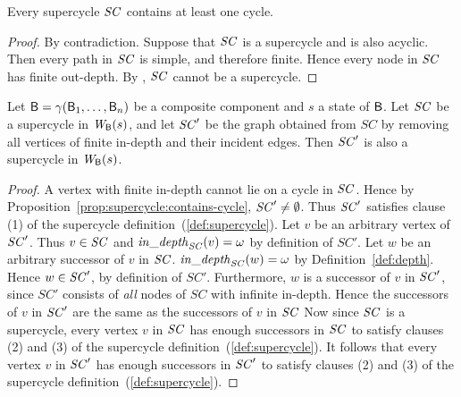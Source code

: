 \begin{proposition} \label{prop:supercycle:contains-cycle}
Every supercycle $\mathit{SC}$ contains at least one cycle.
\end{proposition} 
%
\begin{proof}
By contradiction. Suppose that $\mathit{SC}$ is a supercycle and is also acyclic. Then every path in $\mathit{SC}$ is simple, and therefore finite.  Hence every
node in $\mathit{SC}$ has finite out-depth. By , $\mathit{SC}$ cannot be a supercycle.
\end{proof}


\begin{proposition} \label{prop:supercycle:essential-subgraph-of} Let $\mathsf{B} =
\gamma(\mathsf{B}_1,\dots,\mathsf{B}_n)$ be a composite component and $s$ a state of
$\mathsf{B}$.  Let $\mathit{SC}$ be a supercycle in $\mathit{W}_{\mathsf{B}}({s})$, and let $\mathit{SC}'$ be the
graph obtained from $SC$ by removing all vertices of finite in-depth
and their incident edges. Then $\mathit{SC}'$ is also a supercycle in
$\mathit{W}_{\mathsf{B}}({s})$. 
\end{proposition} 
%
\begin{proof}
A vertex with finite in-depth cannot lie on a cycle in $\mathit{SC}$.  Hence
by Proposition~\ref{prop:supercycle:contains-cycle}, $\mathit{SC}' \neq
\emptyset$. Thus $\mathit{SC}'$ satisfies clause (1) of the supercycle
definition~(\ref{def:supercycle}).
%
Let $v$ be an arbitrary vertex of $\mathit{SC}'$.  Thus $v \in \mathit{SC}$ and $\mathit{in\_depth}_{\mathit{SC}}({v}) = \omega$ by definition of $SC'$. Let
$w$ be an arbitrary successor of $v$ in $\mathit{SC}$. $\mathit{in\_depth}_{\mathit{SC}}({w}) = \omega$ by Definition~\ref{def:depth}. Hence
$w \in \mathit{SC}'$, by definition of $SC'$.  Furthermore, $w$ is a successor of $v$ in $\mathit{SC}'$, since $SC'$ consists of
\emph{all} nodes of $SC$ with infinite in-depth. Hence the successors of $v$ in $\mathit{SC}'$ are
the same as the successors of $v$ in $\mathit{SC}$
%
%
Now since $\mathit{SC}$ is a supercycle, every vertex $v$ in $\mathit{SC}$ has enough successors in $\mathit{SC}$ to satisfy clauses (2) and (3)
of the supercycle definition~(\ref{def:supercycle}). It follows that every vertex $v$ in $\mathit{SC}'$ has enough successors in
$\mathit{SC}'$ to satisfy clauses (2) and (3) of the supercycle definition~(\ref{def:supercycle}).  
\end{proof}

